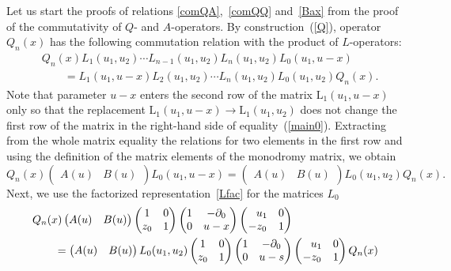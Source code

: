 \documentclass[pdftex]{sigma}
\numberwithin{equation}{section}
\begin{document}
Let us start the proofs of relations
\eqref{comQA},~\eqref{comQQ} and~\eqref{Bax} from the proof of
the commutativity of $Q$- and $A$-operators.
By construction~(\ref{Q}), operator
$Q_n(x)$ has the following commutation relation with the
product of $L$-operators:
\begin{align}
& \nonumber
Q_n(x)
L_{1}(u_{1},u_{2})\cdots
L_{n-1}(u_{1},u_{2})
L_{n}(u_{1},u_{2})
L_{0}(u_{1},u-x) \\
& \qquad
= L_{1}(u_{1},u-x)
L_{2}(u_{1},u_{2})\cdots
L_{n}(u_{1},u_{2})
L_{0}(u_{1},u_{2}) Q_n(x).\label{main0}
\end{align}
Note that parameter $u-x$ enters the second row of the matrix $\mathrm{L}_{1}\left(u_{1},u-x\right)$ only
so that the replacement $\mathrm{L}_{1}\left(u_{1},u-x\right)\to \mathrm{L}_{1}\left(u_{1},u_{2}\right)$ does not change the first
row of the matrix in the right-hand side of equality~(\ref{main0}).
Extracting from the whole matrix equality the relations for two elements in the first row and using the definition of the matrix elements of the monodromy matrix, we obtain
\begin{equation*}
Q_n(x)
\begin{pmatrix}
A(u) & B(u)
\end{pmatrix}
L_{0}(u_{1},u-x) = \begin{pmatrix}
A(u) & B(u)
\end{pmatrix}
L_{0}(u_{1},u_{2}) Q_n(x).
\end{equation*}
Next, we use the factorized representation~\eqref{Lfac} for the matrices
$L_0$
\begin{align*}
&
Q_n(x)
\begin{pmatrix}
A(u) & B(u)
\end{pmatrix}
\begin{pmatrix}
 1 & 0 \\
 z_0 & 1 \\
\end{pmatrix}
\begin{pmatrix}
 1 & -\partial_{0} \\
 0 & u-x \\
\end{pmatrix}
\begin{pmatrix}
 \hphantom{-}u_1 & 0 \\
 -z_0 & 1 \\
\end{pmatrix} \\
& \qquad{}
=
\begin{pmatrix}
A(u) & B(u)
\end{pmatrix}
L_{0}(u_{1},u_{2})
\begin{pmatrix}
 1 & 0 \\
 z_0 & 1 \\
\end{pmatrix}
\begin{pmatrix}
 1 & -\partial_{0} \\
 0 & u-s \\
\end{pmatrix}
\begin{pmatrix}
 \hphantom{-}u_1 & 0 \\
 -z_0 & 1 \\
\end{pmatrix} Q_n(x)
\end{align*}
\end{document}
